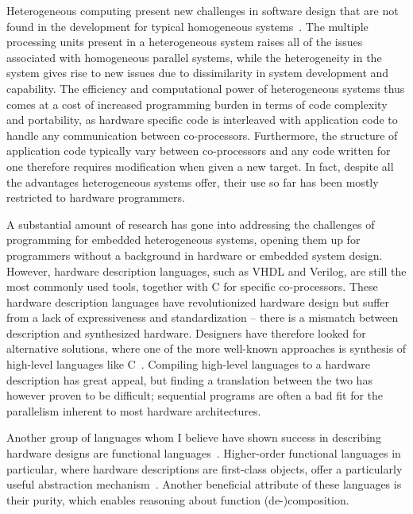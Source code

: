 Heterogeneous computing present new challenges in software design that are not found in the development for typical homogeneous systems~\cite{kunzman2011}. The multiple processing units present in a heterogeneous system raises all of the issues associated with homogeneous parallel systems, while the heterogeneity in the system gives rise to new issues due to  dissimilarity in system development and capability. The efficiency and computational power of heterogeneous systems thus comes at a cost of increased programming burden in terms of code complexity and portability, as hardware specific code is interleaved with application code to handle any communication between co-processors. Furthermore, the structure of application code typically vary between co-processors and any code written for one therefore requires modification when given a new target. In fact, despite all the advantages heterogeneous systems offer, their use so far has been mostly restricted to hardware programmers.

A substantial amount of research has gone into addressing the challenges of programming for embedded heterogeneous systems, opening them up for programmers without a background in hardware or embedded system design. However, hardware description languages, such as VHDL and Verilog, are still the most commonly used tools, together with C for specific co-processors. These hardware description languages have revolutionized hardware design but suffer from a lack of expressiveness and standardization -- there is a mismatch between description and synthesized hardware. Designers have therefore looked for alternative solutions, where one of the more well-known approaches is synthesis of high-level languages like C~\cite{graphics2008, ghenassia2005}. Compiling high-level languages to a hardware description has great appeal, but finding a translation between the two has however proven to be difficult; sequential programs are often a bad fit for the parallelism inherent to most hardware architectures.

Another group of languages whom I believe have shown success in describing hardware designs are functional languages~\cite{sheeran2005}. Higher-order functional languages in particular, where hardware descriptions are first-class objects, offer a particularly useful abstraction mechanism~\cite{baaij2010, bjesse1998, gill2010}. Another beneficial attribute of these languages is their purity, which enables reasoning about function (de-)composition. 


